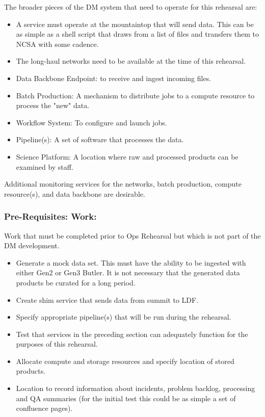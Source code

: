 The broader pieces of the DM system that need to operate for this rehearsal are:
\begin{itemize}[topsep=-8pt]
\item A service must operate at the mountaintop that will send data.  This can 
be as simple as a shell script that draws from a list of files and transfers 
them to NCSA with some cadence. 
\item The long-haul networks need to be available at the time of this rehearsal.
\item Data Backbone Endpoint: to receive and ingest incoming files.
\item Batch Production: A mechanism to distribute jobs to a compute resource 
to process the "new" data.
\item Workflow System:  To configure and launch jobs.
\item Pipeline(s): A set of software that processes the data.
\item Science Platform: A location where raw and processed products can be 
examined by staff.
\end{itemize}

Additional monitoring services for the networks, batch production, compute 
resource(s), and data backbone are desirable.

\subsubsection{Pre-Requisites: Work:}\label{prework}

Work that must be completed prior to Ops Rehearsal but which is not part of 
the DM development.
\begin{itemize}[topsep=-8pt]
\item Generate a mock data set.  This must have the ability to be ingested with 
either Gen2 or Gen3 Butler.  It is not necessary that the generated data 
products be curated for a long period.
\item Create shim service that sends data from summit to LDF.
\item Specify appropriate pipeline(s) that will be run during the rehearsal.
\item Test that services in the preceding section can adequately function 
for the purposes of this rehearsal.
\item Allocate compute and storage resources and specify location of stored 
products.
\item Location to record information about incidents, problem backlog, 
processing and QA summaries (for the initial test this could be as simple a 
set of confluence pages).
\end{itemize}


